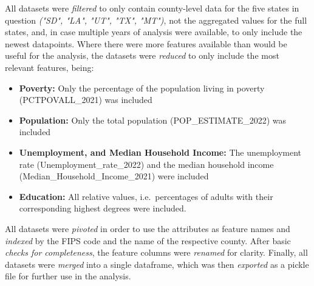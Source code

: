 All datasets were \textit{filtered} to only contain county-level data for the five states in question \textit{("SD", "LA", "UT", "TX", "MT")}, not the aggregated values for the full states, and, in case multiple years of analysis were available, to only include the newest datapoints. 
Where there were more features available than would be useful for the analysis, the datasets were \textit{reduced} to only include the most relevant features, being:

\begin{itemize}
    \item \textbf{Poverty:} Only the percentage of the population living in poverty (PCTPOVALL\_2021) was included
    \item \textbf{Population:} Only the total population (POP\_ESTIMATE\_2022) was included
    \item \textbf{Unemployment, and Median Household Income:} The unemployment rate (Unemployment\_rate\_2022) and the median household income (Median\_Household\_Income\_2021) were included
    \item \textbf{Education:} All relative values, i.e.\ percentages of adults with their corresponding highest degrees were included.
\end{itemize}

All datasets were \textit{pivoted} in order to use the attributes as feature names and \textit{indexed} by the FIPS code and the name of the respective county. 
After basic \textit{checks for completeness}, the feature columns were \textit{renamed} for clarity. Finally, all datasets were \textit{merged} into a single dataframe, which was then \textit{exported} as a pickle file for further use in the analysis.